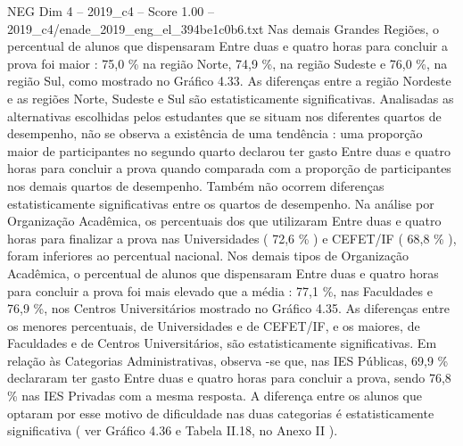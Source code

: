 \begin{textsample}{NEG Dim 4 – 2019\_c4 – Score 1.00 – 2019\_c4/enade\_2019\_eng\_el\_394be1c0b6.txt}
Nas demais Grandes Regiões, o percentual de alunos que dispensaram Entre duas e quatro horas para concluir a prova foi maior : 75,0 \% na região Norte, 74,9 \%, na região Sudeste e 76,0 \%, na região Sul, como mostrado no Gráfico 4.33.
As diferenças entre a região Nordeste e as regiões Norte, Sudeste e Sul são estatisticamente significativas.
Analisadas as alternativas escolhidas pelos estudantes que se situam nos diferentes quartos de desempenho, não se observa a existência de uma tendência : uma proporção maior de participantes no segundo quarto declarou ter gasto Entre duas e quatro horas para concluir a prova quando comparada com a proporção de participantes nos demais quartos de desempenho.
Também não ocorrem diferenças estatisticamente significativas entre os quartos de desempenho.
Na análise por Organização Acadêmica, os percentuais dos que utilizaram Entre duas e quatro horas para finalizar a prova nas Universidades ( 72,6 \% ) e CEFET/IF ( 68,8 \% ), foram inferiores ao percentual nacional.
Nos demais tipos de Organização Acadêmica, o percentual de alunos que dispensaram Entre duas e quatro horas para concluir a prova foi mais elevado que a média : 77,1 \%, nas Faculdades e 76,9 \%, nos Centros Universitários mostrado no Gráfico 4.35.
As diferenças entre os menores percentuais, de Universidades e de CEFET/IF, e os maiores, de Faculdades e de Centros Universitários, são estatisticamente significativas.
Em relação às Categorias Administrativas, observa -se que, nas IES Públicas, 69,9 \% declararam ter gasto Entre duas e quatro horas para concluir a prova, sendo 76,8 \% nas IES Privadas com a mesma resposta.
A diferença entre os alunos que optaram por esse motivo de dificuldade nas duas categorias é estatisticamente significativa ( ver Gráfico 4.36 e Tabela II.18, no Anexo II ).

\end{textsample}
